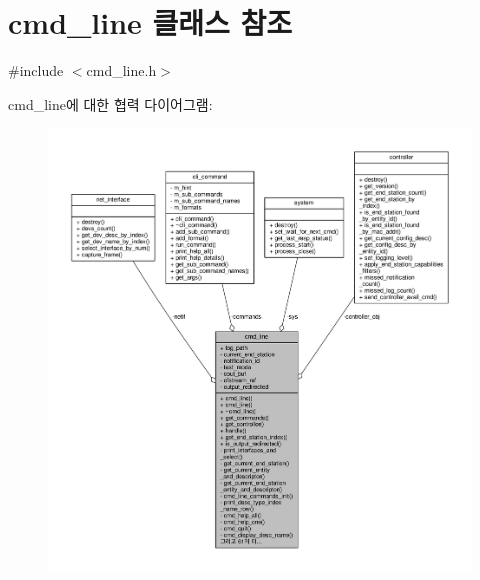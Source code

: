 \hypertarget{classcmd__line}{}\section{cmd\+\_\+line 클래스 참조}
\label{classcmd__line}


{\ttfamily \#include $<$cmd\+\_\+line.\+h$>$}



cmd\+\_\+line에 대한 협력 다이어그램\+:
\nopagebreak
\begin{figure}[H]
\begin{center}
\leavevmode
\includegraphics[width=350pt]{classcmd__line__coll__graph}
\end{center}
\end{figure}
